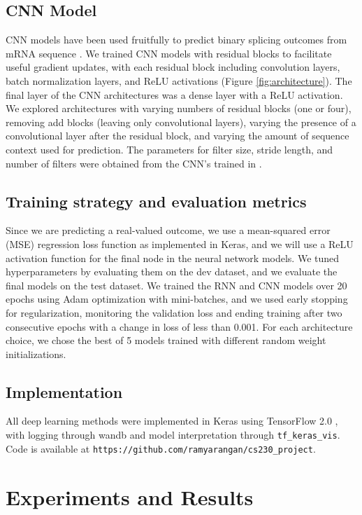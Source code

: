 \documentclass{article}
\begin{document}
\subsection{CNN Model}
CNN models have been used fruitfully to predict binary splicing outcomes from mRNA sequence \cite{spliceai}. We trained CNN models with residual blocks to facilitate useful gradient updates, with each residual block including convolution layers, batch normalization layers, and ReLU activations (Figure \ref{fig:architecture}). The final layer of the CNN architectures was a dense layer with a ReLU activation. We explored architectures with varying numbers of residual blocks (one or four), removing add blocks (leaving only convolutional layers), varying the presence of a convolutional layer after the residual block, and varying the amount of sequence context used for prediction. The parameters for filter size, stride length, and number of filters were obtained from the CNN's trained in \cite{spliceai}.
\subsection{Training strategy and evaluation metrics}
Since we are predicting a real-valued outcome, we use a mean-squared error (MSE) regression loss function as implemented in Keras, and we will use a ReLU activation function for the final node in the neural network models. We tuned hyperparameters by evaluating them on the dev dataset, and we evaluate the final models on the test dataset. We trained the RNN and CNN models over 20 epochs using Adam optimization with mini-batches, and we used early stopping for regularization, monitoring the validation loss and ending training after two consecutive epochs with a change in loss of less than 0.001. For each architecture choice, we chose the best of 5 models trained with different random weight initializations. 
\subsection{Implementation} 
All deep learning methods were implemented in Keras using TensorFlow 2.0 \cite{tensorflow}, with logging through wandb and model interpretation through \texttt{tf\_keras\_vis}. Code is available at \texttt{https://github.com/ramyarangan/cs230\_project}.

\section{Experiments and Results}
\end{document}
